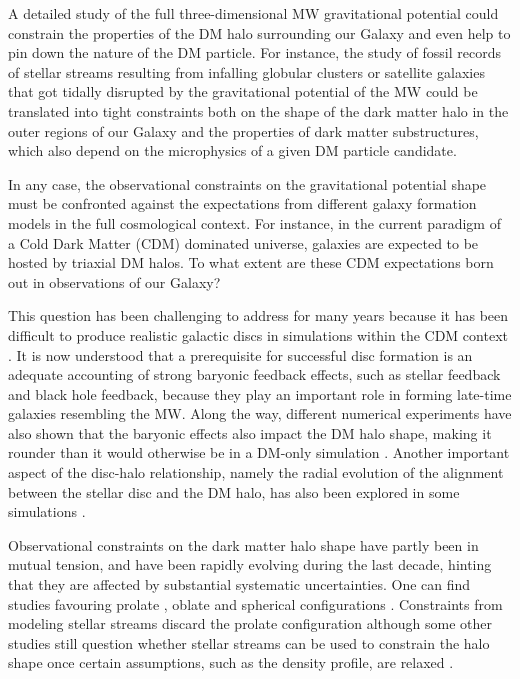 \documentclass[usenatbib]{mnras}
\begin{document}
A detailed study of the full three-dimensional MW
gravitational potential could constrain the properties of the DM halo surrounding our Galaxy and even help to pin down the nature of the DM particle. For instance, the study of fossil records of stellar streams resulting from infalling globular clusters or
satellite galaxies that got tidally disrupted by the gravitational
potential of the MW could be translated into tight constraints 
both on the shape of the dark matter halo in the outer regions of our Galaxy \citep{1998ApJ...495..297J,1999MNRAS.307..495H, 1999MNRAS.307..877T} and the properties of dark matter substructures, which also depend on the microphysics of a given DM particle candidate.

In any case, the observational constraints on the gravitational potential shape must be confronted against the expectations from different galaxy formation models in the full cosmological context.
For instance, in the current paradigm of a Cold Dark Matter
(CDM) dominated universe, galaxies are expected to be hosted by
triaxial DM halos. To what extent are these CDM expectations born out in observations of our Galaxy? 

This question has been challenging to address for many years because it has been difficult to produce realistic galactic discs in simulations within the CDM context \citep{1997ApJ...478...13N}.
It is now understood that a prerequisite for successful disc formation is an adequate 
accounting of strong baryonic feedback effects, such as stellar feedback and black hole feedback, because they play an important role in forming late-time galaxies resembling the MW.
Along the way, different numerical experiments have also shown that the baryonic
effects also impact the DM halo shape, making it rounder
than it would otherwise be in a DM-only simulation
\citep{Dubinski94,Debattista08,Kazantzidis10,Abadi10,Bryan13,Chua19,Artale19}. 
Another important aspect of the disc-halo relationship, namely the radial evolution of the alignment between the stellar disc and the DM halo, has also been explored in some simulations \citep{Bailin05,Debattista13}. 

Observational constraints on the dark matter halo shape
have partly been in mutual tension, and have been rapidly evolving during the last decade, hinting that they are affected by substantial systematic uncertainties.
One can find studies favouring prolate
\citep{Banerjee_and_Chanda_2011,Bowden_et_al._2016},  oblate
\citep{LM10,Deg_and_Widrow_2013,Vera-Ciro_and_Helmi_2013} and
spherical configurations \citep{Bovy16}.  
Constraints from modeling stellar streams discard the prolate
configuration \citep{LM10,Pearson_et_al._2015,Bovy16} although some other studies
still question whether stellar streams can be used to constrain the halo
shape once certain assumptions, such as the density profile, are relaxed
\citep{Ibata_et_al._2013}. 
\end{document}
